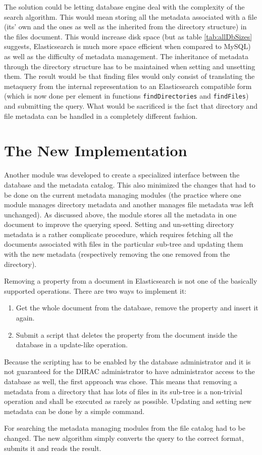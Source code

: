 The solution could be letting database engine deal 
with the complexity of the search algorithm. This would mean storing all the metadata associated with a file (its' 
own and the ones as well as the inherited from the directory structure) in the files document. This would increase
disk space (but as table \ref{tab:allDbSizes} suggests, Elasticsearch is much more space efficient when compared 
to MySQL) as well as the difficulty of metadata management. The inheritance of metadata through the directory 
structure has to be maintained when setting and unsetting them. The result would be that finding files would 
only consist of translating the metaquery from the internal representation to an Elasticsearch compatible form 
(which is now done per element in functions \texttt{findDirectories} and \texttt{findFiles}) and submitting the
query. What would be sacrificed is the fact that directory and file metadata can be handled in a completely 
different fashion.

\section{The New Implementation}

Another module was developed to create a specialized interface between the database and the metadata catalog. This 
also minimized the changes that had to be done on the current metadata managing modules (the practice where one
module manages directory metadata and another manages file metadata was left unchanged). As discussed above, the 
module stores all the metadata in one document to improve the querying speed. Setting and un-setting directory 
metadata is a rather complicate procedure, which requires fetching all the documents associated with files in
the particular sub-tree and updating them with the new metadata (respectively removing the one removed from the 
directory). 

Removing a property from a document in Elasticsearch is not one of the basically supported operations. There are 
two ways to implement it: 
\begin{enumerate}
\item Get the whole document from the database, remove the property and insert it again.
\item Submit a script that deletes the property from the document inside the database in a update-like operation.
\end{enumerate}
Because the scripting has to be enabled by the database administrator and it is not guaranteed for the DIRAC 
administrator to have administrator access to the database as well, the first approach was chose. This means that
removing a metadata from a directory that has lots of files in its sub-tree is a non-trivial operation and shall
be executed as rarely as possible. Updating and setting new metadata can be done by a simple command.

For searching the metadata managing modules from the file catalog had to be changed. The new algorithm simply 
converts the query to the correct format, submits it and reads the result.